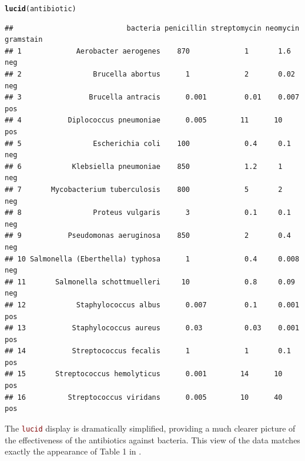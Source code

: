 \documentclass[12pt]{article}\usepackage[]{graphicx}\usepackage[]{color}
\makeatletter
\newcommand{\hlstd}[1]{\textcolor[rgb]{0.345,0.345,0.345}{#1}}%
\newcommand{\hlkwd}[1]{\textcolor[rgb]{0.737,0.353,0.396}{\textbf{#1}}}%
\newenvironment{kframe}{%
 \def\at@end@of@kframe{}%
 \ifinner\ifhmode%
  \def\at@end@of@kframe{\end{minipage}}%
  \begin{minipage}{\columnwidth}%
 \fi\fi%
 \def\FrameCommand##1{\hskip\@totalleftmargin \hskip-\fboxsep
 \colorbox{shadecolor}{##1}\hskip-\fboxsep
     \hskip-\linewidth \hskip-\@totalleftmargin \hskip\columnwidth}%
 \MakeFramed {\advance\hsize-\width
   \@totalleftmargin\z@ \linewidth\hsize
   \@setminipage}}%
 {\par\unskip\endMakeFramed%
 \at@end@of@kframe}
\newenvironment{knitrout}{}{} %
\newcommand{\code}[1]{\texttt{\textcolor{maroon}{#1}}}
\makeatother
\begin{document}
\begin{knitrout}
\color{fgcolor}\begin{kframe}
\begin{alltt}
\hlkwd{lucid}\hlstd{(antibiotic)}
\end{alltt}
\begin{verbatim}
##                           bacteria penicillin streptomycin neomycin gramstain
## 1             Aerobacter aerogenes    870             1       1.6         neg
## 2                 Brucella abortus      1             2       0.02        neg
## 3                Brucella antracis      0.001         0.01    0.007       pos
## 4           Diplococcus pneumoniae      0.005        11      10           pos
## 5                 Escherichia coli    100             0.4     0.1         neg
## 6            Klebsiella pneumoniae    850             1.2     1           neg
## 7       Mycobacterium tuberculosis    800             5       2           neg
## 8                 Proteus vulgaris      3             0.1     0.1         neg
## 9           Pseudomonas aeruginosa    850             2       0.4         neg
## 10 Salmonella (Eberthella) typhosa      1             0.4     0.008       neg
## 11       Salmonella schottmuelleri     10             0.8     0.09        neg
## 12            Staphylococcus albus      0.007         0.1     0.001       pos
## 13           Staphylococcus aureus      0.03          0.03    0.001       pos
## 14           Streptococcus fecalis      1             1       0.1         pos
## 15       Streptococcus hemolyticus      0.001        14      10           pos
## 16          Streptococcus viridans      0.005        10      40           pos
\end{verbatim}
\end{kframe}
\end{knitrout}
The \code{lucid} display is dramatically simplified, providing a
much clearer picture of the effectiveness of the antibiotics against
bacteria.  This view of the data matches exactly the appearance of
Table 1 in \cite{wainer2009pictures}.
\end{document}
